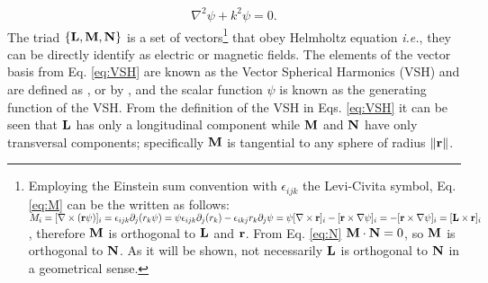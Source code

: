 \begin{align}
	\nabla^2 \psi + k^2 \psi = 0.
\label{eq:HelmoltzScalar}
\end{align}
%
The triad $\left\{\vb{L},\vb{M},\vb{N}\right\}$ is a set of vectors\footnote{%
		Employing the Einstein sum convention with $\epsilon_{ijk}$ the Levi-Civita symbol, Eq. \eqref{eq:M} can be the written as follows:%
	 		$M_i = [\nabla\times(\vb{r}\psi)]_i
	 		=  \epsilon_{ijk}\partial_j(r_k\psi)
	 		=\psi\epsilon_{ijk}\partial_j(r_k) -\epsilon_{ikj}r_k\partial_j\psi
	 		=\psi[\nabla\times\vb{r}]_i - [\vb{r}\times\nabla\psi]_i
	 		= - [\vb{r}\times\nabla\psi]_i
	 		= [\vb{L}\times\vb{r}]_i$,%
	 	therefore $\vb{M}$ is orthogonal to $\vb{L}$ and $\vb{r}$. From Eq. \eqref{eq:N} $\vb{M}\cdot\vb{N}=0$, so $\vb{M}$ is orthogonal to $\vb{N}$. As it will be shown, not necessarily $\vb{L}$ is orthogonal to $\vb{N}$ in a geometrical sense.
	}%
 that obey Helmholtz equation \textit{i.e.}, they can be directly identify as electric or magnetic fields. The elements of the vector basis from Eq. \eqref{eq:VSH}   are known as the Vector Spherical Harmonics (VSH) and are defined as  \citeauthor{stratton_electromagnetic_2012} \cite{stratton_electromagnetic_2012}, or by \citeauthor{bohren_absorption_1983} \cite{bohren_absorption_1983}, and the scalar function $\psi$ is known as the generating function of the VSH. From the definition of the VSH in Eqs. \eqref{eq:VSH} it can be seen that $\vb{L}$ has only a longitudinal component while $\vb{M}$ and $\vb{N}$ have only transversal components; specifically $\vb{M}$ is tangential to any sphere of radius $\norm{\vb{r}}$.

